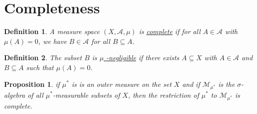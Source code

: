 \documentclass[12pt]{article}
\newtheorem{definition}{Definition}[subsection]
\newtheorem{proposition}{Proposition}[subsection]
\begin{document}
\section{Completeness}
\begin{definition}
	A measure space $(X, \mathcal{A}, \mu)$ is \underline{complete} if for all $A \in \mathcal{A}$ with $\mu(A) = 0$, we have $B \in \mathcal{A}$ for all $B \subseteq A$.
\end{definition}
\begin{definition}
	The subset $B$ is \underline{$\mu$ -negligible} if there exists $A\subseteq X$ with $A \in \mathcal{A}$ and $B \subseteq A$ such that $\mu(A) = 0$.
\end{definition}
\begin{proposition}
	if $\mu^*$ is is an outer measure on the set $X$ and if $\mathcal{M}_{\mu^*}$ is the $\sigma$-algebra of all $\mu^*$-measurable subsets of $X$, then the restriction of $\mu^*$ to $\mathcal{M}_{\mu^*}$ is complete.
\end{proposition}
\end{document}
